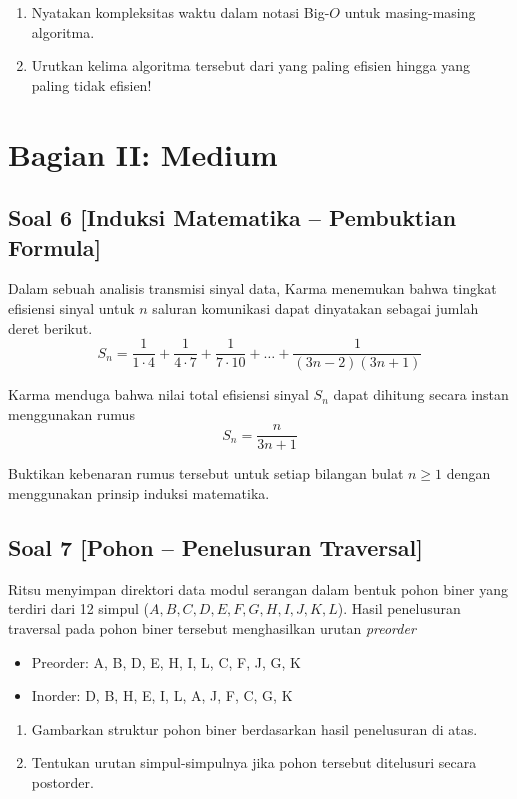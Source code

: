 \documentclass[12pt,a4paper]{article}
\begin{document}
\begin{enumerate}[label=(\alph*)]
    \item Nyatakan kompleksitas waktu dalam notasi Big-$O$ untuk masing-masing algoritma.
    \item Urutkan kelima algoritma tersebut dari yang paling efisien hingga yang paling tidak efisien!
\end{enumerate}

\newpage
\section*{Bagian II: Medium}

\subsection*{Soal 6 [Induksi Matematika -- Pembuktian Formula]}
Dalam sebuah analisis transmisi sinyal data, Karma menemukan bahwa tingkat efisiensi sinyal untuk $n$ saluran komunikasi dapat dinyatakan sebagai jumlah deret berikut.
\[ S_n = \frac{1}{1 \cdot 4} + \frac{1}{4 \cdot 7} + \frac{1}{7 \cdot 10} + \dots + \frac{1}{(3n-2)(3n+1)} \]

Karma menduga bahwa nilai total efisiensi sinyal $S_n$ dapat dihitung secara instan menggunakan rumus
\[ S_n = \frac{n}{3n+1} \]

Buktikan kebenaran rumus tersebut untuk setiap bilangan bulat $n \geq 1$ dengan menggunakan prinsip induksi matematika.

\subsection*{Soal 7 [Pohon -- Penelusuran Traversal]}
Ritsu menyimpan direktori data modul serangan dalam bentuk pohon biner yang terdiri dari 12 simpul ($A, B, C, D, E, F, G, H, I, J, K, L$). Hasil penelusuran traversal pada pohon biner tersebut menghasilkan urutan \textit{preorder}
\begin{itemize}
    \item Preorder: A, B, D, E, H, I, L, C, F, J, G, K
    \item Inorder: D, B, H, E, I, L, A, J, F, C, G, K
\end{itemize}

\begin{enumerate}[label=(\alph*)]
    \item Gambarkan struktur pohon biner berdasarkan hasil penelusuran di atas.
    \item Tentukan urutan simpul-simpulnya jika pohon tersebut ditelusuri secara postorder.
\end{enumerate}
\end{document}
